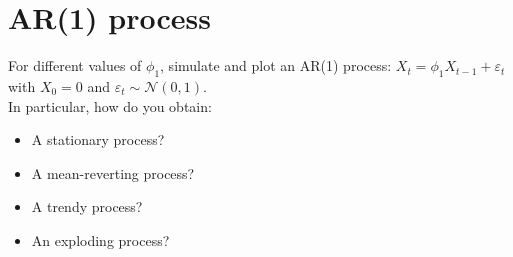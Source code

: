 \section{AR(1) process}
For different values of $\phi_1$, simulate and plot an AR(1) process: $X_t = \phi_1 X_{t-1} + \varepsilon_t$ with $X_0 = 0$ and $\varepsilon_t \sim \mathcal{N}(0, 1)$.\\

\noindent In particular, how do you obtain:
\begin{itemize}
    \item A stationary process?
    \item A mean-reverting process?
    \item A trendy process?
    \item An exploding process?
\end{itemize}

